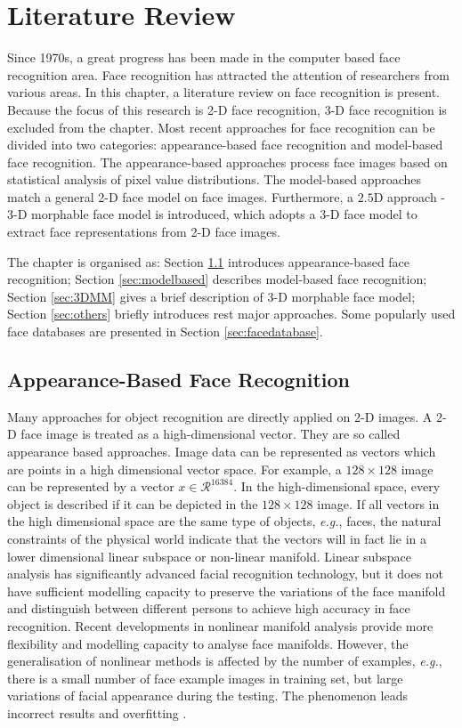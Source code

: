 \chapter{Literature Review}
\label{ch:review}
Since 1970s, a great progress has been made in the computer based face recognition area. Face recognition has attracted the attention of researchers from various areas. In this chapter, a literature review on face recognition is present. Because the focus of this research is 2-D face recognition, 3-D face recognition is excluded from the chapter. Most recent approaches for face recognition can be divided into two categories: appearance-based face recognition and model-based face recognition. The appearance-based approaches process face images based on statistical analysis of pixel value distributions. The model-based approaches match a general 2-D face model on face images. Furthermore, a $2.5$D approach - 3-D morphable face model is introduced, which adopts a 3-D face model to extract face representations from 2-D face images. 

The chapter is organised as: \mbox{Section} \ref{sec:appearancebased} introduces appearance-based face recognition; \mbox{Section} \ref{sec:modelbased} describes model-based face recognition; \mbox{Section} \ref{sec:3DMM} gives a brief description of 3-D morphable face model; \mbox{Section} \ref{sec:others} briefly introduces rest major approaches. Some popularly used face databases are presented in \mbox{Section} \ref{sec:facedatabase}.

\section{Appearance-Based Face Recognition}
\label{sec:appearancebased}
Many approaches for object recognition are directly applied on 2-D images. A 2-D face image is treated as a high-dimensional vector. They are so called appearance based approaches. Image data can be represented as vectors which are points in a high dimensional vector space. For example, a $128 \times 128$ image can be represented by a vector $x \in \mathcal{R}^{16384}$. In the high-dimensional space, every object is described if it can be depicted in the $128 \times 128$ image. If all vectors in the high dimensional space are the same type of objects, \textit{e.g.}, faces, the natural constraints of the physical world indicate that the vectors will in fact lie in a lower dimensional linear subspace or non-linear manifold. Linear subspace analysis has significantly advanced facial recognition technology, but it does not have sufficient modelling capacity to preserve the variations of the face manifold and distinguish between different persons to achieve high accuracy in face recognition. Recent developments in nonlinear manifold analysis provide more flexibility and modelling capacity to analyse face manifolds. However, the generalisation of nonlinear methods is affected by the number of examples, \textit{e.g.}, there is a small number of face example images in training set, but large variations of facial appearance during the testing. The phenomenon leads incorrect results and overfitting \cite{Zhao2003}.
